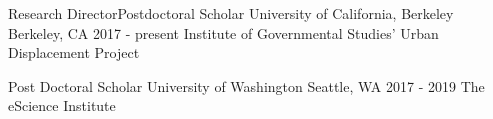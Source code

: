 

\begin{cventries}

  \cventry
    {Research Director{\enskip\cdotp\enskip}Postdoctoral Scholar} %
    {University of California, Berkeley} %
    {Berkeley, CA} %
    {2017 - present} %
    {Institute of Governmental Studies' Urban Displacement Project}

  \cventry
    {Post Doctoral Scholar} %
    {University of Washington} %
    {Seattle, WA} %
    {2017 - 2019} %
    {The eScience Institute}

\end{cventries}
